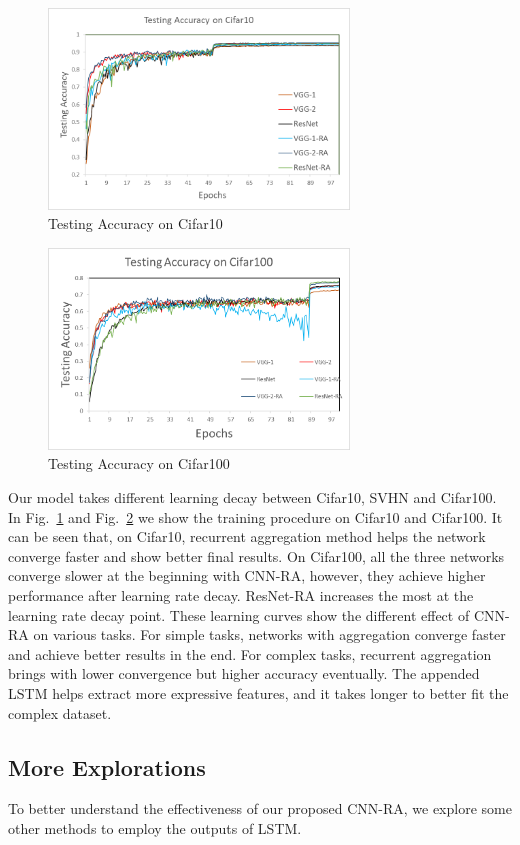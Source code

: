 \documentclass[conference]{IEEEtran}
\begin{document}
\begin{figure}   
	\centering
	\includegraphics[width=8cm]{Figures/cifar10.png}
	\caption{Testing Accuracy on Cifar10}
	\label{fig:Cifar10}
\end{figure}
\begin{figure}  
	\centering
	\includegraphics[width=8cm]{Figures/cifar100.png}
	\caption{Testing Accuracy on Cifar100}
	\label{fig:Cifar100}
\end{figure}

Our model takes different learning decay between Cifar10, SVHN and Cifar100. In Fig.~\ref{fig:Cifar10} and Fig.~\ref{fig:Cifar100} we show the training procedure on Cifar10 and Cifar100. It can be seen that, on Cifar10, recurrent aggregation method helps the network converge faster and show better final results. On Cifar100, all the three networks converge slower at the beginning with CNN-RA, however, they achieve higher performance after learning rate decay. ResNet-RA increases the most at the learning rate decay point. These learning curves show the different effect of CNN-RA on various tasks. For simple tasks, networks with aggregation converge faster and achieve better results in the end. For complex tasks, recurrent aggregation brings with lower convergence but higher accuracy eventually. The appended LSTM helps extract more expressive features, and it takes longer to better fit the complex dataset.


\subsection{More Explorations}
To better understand the effectiveness of our proposed CNN-RA, we explore some other methods to employ the outputs of LSTM.
\end{document}
